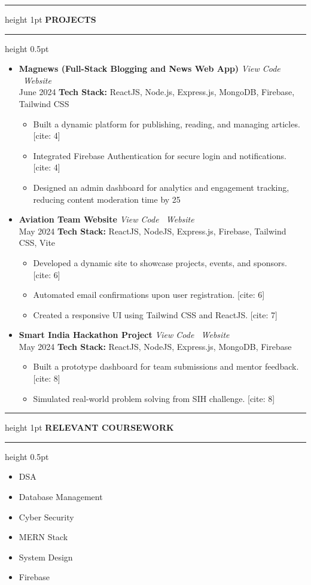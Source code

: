 \documentclass[10pt, letterpaper]{article}
\newcommand{\sectiontitle}[1]{\vspace{6pt}\hrule height 1pt \vspace{3pt}\textbf{\large #1}\vspace{3pt}\hrule height 0.5pt \vspace{6pt}}
\newcommand{\projectitem}[3]{\textbf{#1} \hfill \textit{#2} \\ #3}
\begin{document}
\sectiontitle{PROJECTS}
\begin{itemize}
    \item \projectitem{Magnews (Full-Stack Blogging and News Web App)}{\textit{View Code} \textperiodcentered\ \textit{Website}}{June 2024}
          \textbf{Tech Stack:} ReactJS, Node.js, Express.js, MongoDB, Firebase, Tailwind CSS
          \begin{itemize}
              \item Built a dynamic platform for publishing, reading, and managing articles. [cite: 4]
              \item Integrated Firebase Authentication for secure login and notifications. [cite: 4]
              \item Designed an admin dashboard for analytics and engagement tracking, reducing content moderation time by 25%
          \end{itemize}
    \item \projectitem{Aviation Team Website}{\textit{View Code} \textperiodcentered\ \textit{Website}}{May 2024}
          \textbf{Tech Stack:} ReactJS, NodeJS, Express.js, Firebase, Tailwind CSS, Vite
          \begin{itemize}
              \item Developed a dynamic site to showcase projects, events, and sponsors. [cite: 6]
              \item Automated email confirmations upon user registration. [cite: 6]
              \item Created a responsive UI using Tailwind CSS and ReactJS. [cite: 7]
          \end{itemize}
    \item \projectitem{Smart India Hackathon Project}{\textit{View Code} \textperiodcentered\ \textit{Website}}{May 2024}
          \textbf{Tech Stack:} ReactJS, NodeJS, Express.js, MongoDB, Firebase
          \begin{itemize}
              \item Built a prototype dashboard for team submissions and mentor feedback. [cite: 8]
              \item Simulated real-world problem solving from SIH challenge. [cite: 8]
          \end{itemize}
\end{itemize}

\sectiontitle{RELEVANT COURSEWORK}
\begin{itemize}
    \item DSA
    \item Database Management
    \item Cyber Security
    \item MERN Stack
    \item System Design
    \item Firebase
\end{itemize}
\end{document}
